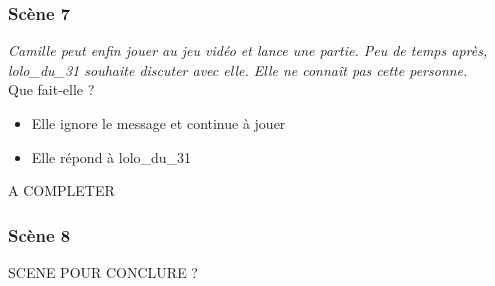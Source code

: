\documentclass[a4paper]{article}
\begin{document}
    \subsubsection{Scène 7}
        \textit{Camille peut enfin jouer au jeu vidéo et lance une partie. Peu de temps après, lolo\_du\_31 souhaite discuter avec elle. Elle ne connaît pas cette personne.} \\
        
        Que fait-elle ?
        \begin{itemize}
            \item Elle ignore le message et continue à jouer
            \item Elle répond à lolo\_du\_31
        \end{itemize}
            A COMPLETER
            
    \subsubsection{Scène 8}
    
    SCENE POUR CONCLURE ?
\end{document}
